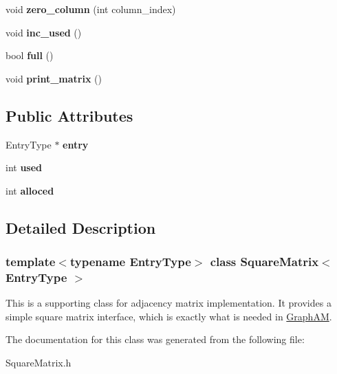 \begin{DoxyCompactItemize}
\mbox{\label{class_square_matrix_a49358eaf89751c1de75ed9c7fc16ccff}} 
void {\bfseries zero\+\_\+column} (int column\+\_\+index)
\item 
\mbox{\label{class_square_matrix_a14035081f651fa9b2e204aa9568e8c77}} 
void {\bfseries inc\+\_\+used} ()
\item 
\mbox{\label{class_square_matrix_ad9c3695c1378269f22a906024e5f2e99}} 
bool {\bfseries full} ()
\item 
\mbox{\label{class_square_matrix_aedf48cb53df57a4bd4384a24ac0509ed}} 
void {\bfseries print\+\_\+matrix} ()
\end{DoxyCompactItemize}
\subsection*{Public Attributes}
\begin{DoxyCompactItemize}
\item 
\mbox{\label{class_square_matrix_a0f49d22baefcfdcb66eb0a2334704a4f}} 
Entry\+Type $\ast$ {\bfseries entry}
\item 
\mbox{\label{class_square_matrix_a8aea772fcf02f5d7304c4fe752c8c83c}} 
int {\bfseries used}
\item 
\mbox{\label{class_square_matrix_ad1a8e83c36682a8e9c75a3172459a4c5}} 
int {\bfseries alloced}
\end{DoxyCompactItemize}


\subsection{Detailed Description}
\subsubsection*{template$<$typename Entry\+Type$>$\newline
class Square\+Matrix$<$ Entry\+Type $>$}

This is a supporting class for adjacency matrix implementation. It provides a simple square matrix interface, which is exactly what is needed in \hyperlink{class_graph_a_m}{Graph\+AM}. 

The documentation for this class was generated from the following file\+:\begin{DoxyCompactItemize}
\item 
Square\+Matrix.\+h\end{DoxyCompactItemize}
